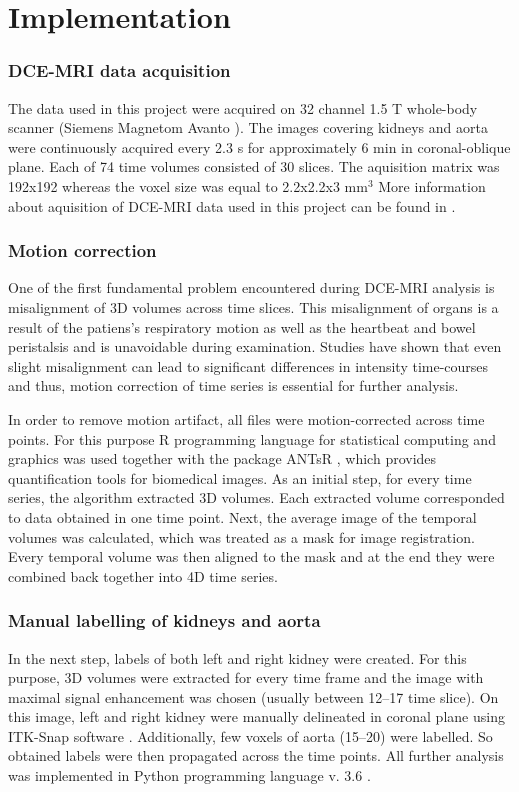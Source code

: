 \chapter{Implementation}
	
\subsection{DCE-MRI data acquisition}
The data used in this project were acquired on 32 channel 1.5 T whole-body scanner (Siemens Magnetom Avanto \cite{simens}).
The  images covering kidneys and aorta were continuously acquired every 2.3 s for approximately 6 min in coronal-oblique plane.
Each of 74 time volumes consisted of 30 slices.
The aquisition matrix was 192x192 whereas the voxel size was equal to 2.2x2.2x3 mm$^3$
More information about aquisition of DCE-MRI data used in this project can be found in \cite{eikefjord2017dynamic}.

\subsection{Motion correction}
One of the first fundamental problem encountered during DCE-MRI analysis is misalignment of 3D volumes across time slices. This misalignment of organs is a result of the patiens's respiratory motion as well as the heartbeat and bowel peristalsis and is unavoidable during examination. Studies have shown that even slight misalignment can lead to significant differences in intensity time-courses \cite{KidneySubsegmentation} and thus, motion correction of time series is essential for further analysis.

In order to remove motion artifact, all files were motion-corrected across time points. For this purpose R programming language for statistical computing and graphics was used \cite{R} together with the package ANTsR \cite{ANTsR}, which provides quantification tools for biomedical images. As an initial step, for every time series, the algorithm extracted 3D volumes. Each extracted volume corresponded to data obtained in one time point. Next, the average image of the temporal volumes was calculated, which was treated as a mask for image registration. Every temporal volume was then aligned to the mask and at the end they were combined back together into 4D time series. 
 
\subsection{Manual labelling of kidneys and aorta} 
\label{subsec:labelling}
In the next step, labels of both left and right kidney were created. For this purpose, 3D volumes were extracted for every time frame and the image with maximal signal enhancement was chosen (usually between 12--17 time slice). On this image, left and right kidney were manually delineated in coronal plane using ITK-Snap software \cite{itk-snap}. Additionally, few voxels of aorta (15--20) were labelled. So obtained labels were then propagated across the time points. All further analysis was implemented in Python programming language v. 3.6 \cite{python}.  
 
